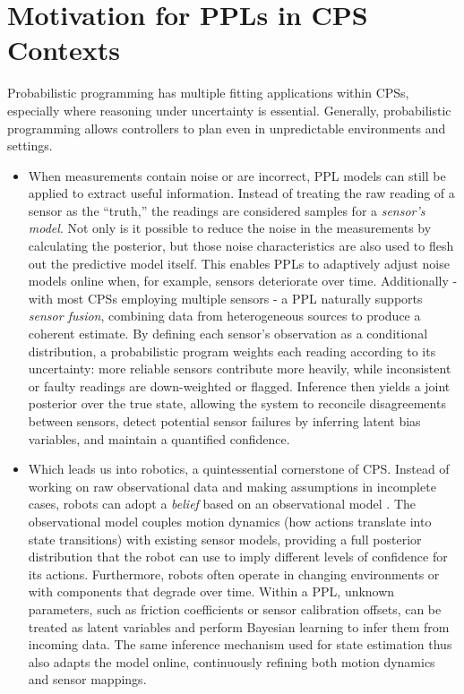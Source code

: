 \section{Motivation for PPLs in CPS Contexts}

Probabilistic programming has multiple fitting applications within CPSs, especially where reasoning under uncertainty is essential. Generally, probabilistic programming
allows controllers to plan even in unpredictable environments and settings.

\begin{multicols}{2}
  \begin{itemize}
    \item When measurements contain noise or are incorrect, PPL models can still be applied to extract useful information. Instead of treating the raw reading of a sensor as the “truth,”
  the readings are considered samples for a \textit{sensor’s model}. Not only is it possible to reduce the noise in the measurements by calculating the posterior,
  but those noise characteristics are also used to flesh out the predictive model itself.
  This enables PPLs to adaptively adjust noise models online when, for example, sensors deteriorate over time.
  Additionally - with most CPSs employing multiple sensors - a PPL naturally supports \textit{sensor fusion}, \cite{cpsSensorFusion} combining data from heterogeneous sources
  to produce a coherent estimate. By defining each sensor's observation as a conditional distribution, a probabilistic program
  weights each reading according to its uncertainty: more reliable sensors contribute more heavily, while inconsistent or faulty readings are down-weighted or flagged.
  Inference then yields a joint posterior over the true state, allowing the system to reconcile disagreements between sensors, detect potential sensor failures by inferring
  latent bias variables, and maintain a quantified confidence.
  \item Which leads us into robotics, a quintessential cornerstone of CPS. Instead of working on raw observational data and making assumptions in incomplete cases, robots can adopt
  a \textit{belief} based on an observational model \cite{cpsProbabilisticRobotics}. The observational model couples motion dynamics (how actions translate into state
  transitions) with existing sensor models, providing a full posterior distribution that the robot can use to imply different levels of confidence for its actions.
  Furthermore, robots often operate in changing environments or with components that degrade over time. Within a PPL, unknown parameters, such as friction
  coefficients or sensor calibration offsets, can be treated as latent variables and perform Bayesian learning to infer them from incoming data. The same inference mechanism used for state
  estimation thus also adapts the model online, continuously refining both motion dynamics and sensor mappings.
  

\end{itemize}
\end{multicols}
